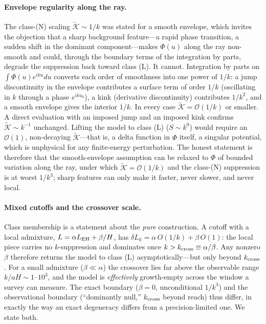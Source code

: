 \documentclass[twocolumn,10pt]{article}
\begin{document}
\paragraph{Envelope regularity along the ray.}
The class-(N) scaling $\widetilde{\mathcal K}\sim1/k$ was stated for a smooth
envelope, which invites the objection that a sharp background feature---a rapid
phase transition, a sudden shift in the dominant component---makes $\Phi(u)$
along the ray non-smooth and could, through the boundary terms of the
integration by parts, degrade the suppression back toward class (L). It cannot.
Integration by parts on $\int\Phi(u)e^{iku}du$ converts each order of
smoothness into one power of $1/k$: a jump discontinuity in the envelope
contributes a surface term of order $1/k$ (oscillating in $k$ through a phase
$e^{iku_0}$), a kink (derivative discontinuity) contributes $1/k^2$, and a
smooth envelope gives the interior $1/k$. In every case $\widetilde{\mathcal
K}=\mathcal{O}(1/k)$ or smaller. A direct evaluation with an imposed jump and an
imposed kink confirms $\widetilde{\mathcal K}\sim k^{-1}$ unchanged. Lifting the
model to class (L) ($S\sim k^0$) would require an $\mathcal{O}(1)$, non-decaying
$\widetilde{\mathcal K}$---that is, a delta function in $\Phi$ itself, a singular
potential, which is unphysical for any finite-energy perturbation. The honest
statement is therefore that the smooth-envelope assumption can be relaxed to
$\Phi$ of bounded variation along the ray, under which $\widetilde{\mathcal
K}=\mathcal{O}(1/k)$ and the class-(N) suppression is at worst $1/k^3$; sharp
features can only make it faster, never slower, and never local.

\paragraph{Mixed cutoffs and the crossover scale.}
Class membership is a statement about the \emph{pure} construction. A cutoff
with a local admixture, $L=\alpha L_{\rm EH}+\beta/H$, has
$\delta L_k=\alpha\,O(1/k)+\beta\,O(1)$: the local piece carries no
$k$-suppression and dominates once $k>k_{\rm cross}\equiv\alpha/\beta$. Any
nonzero $\beta$ therefore returns the model to class (L) asymptotically---but
only beyond $k_{\rm cross}$. For a small admixture ($\beta\ll\alpha$) the
crossover lies far above the observable range $k/aH\sim1$--$10^3$, and the model
is \emph{effectively} growth-empty across the window a survey can measure. The
exact boundary ($\beta=0$, unconditional $1/k^3$) and the observational boundary
(``dominantly null,'' $k_{\rm cross}$ beyond reach) thus differ, in exactly the
way an exact degeneracy differs from a precision-limited one. We state both.
\end{document}
